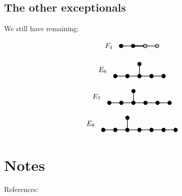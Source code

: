 \documentclass[11pt,oneside]{article}
\begin{document}
\subsection{The other exceptionals}

We still have remaining: %

$$
\DynkinFfour
$$

$$
\DynkinEsix
$$

$$
\DynkinEseven
$$

$$
\DynkinEeight
$$


\section{Notes}

References: 
\cite{Fulton2013}
\cite{Goodman2009}
\cite{Kraft2000}
\cite{Mukai2003}
\cite{Procesi2007}
\cite{Bump2004}
\cite{Miller2004}


{}

\end{document}
